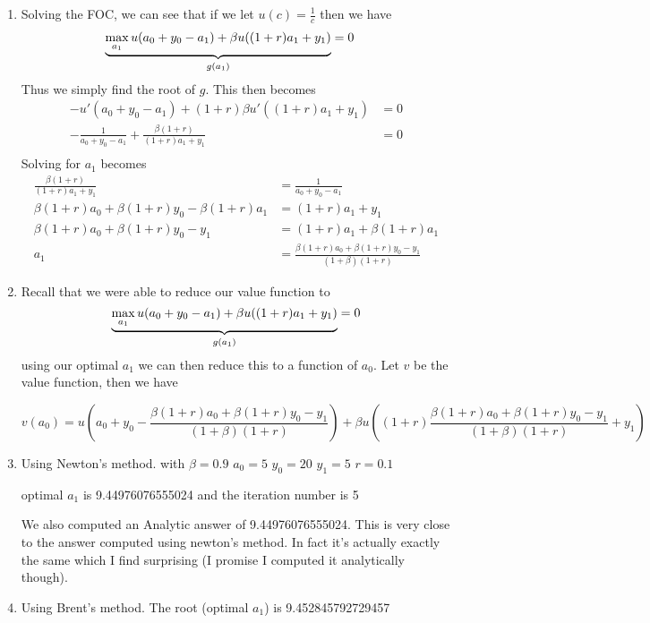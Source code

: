 \documentclass[12pt]{article}
\begin{document}
\begin{enumerate}
	\item  Solving the FOC, we can see that if we let $u(c) = \frac{1}{c}$ then we have
		 \begin{align*}
			 \underbrace{\max_{a_1} u(a_0 + y_0 - a_1) + \beta u((1+r)a_1 + y_1)}_\text{$ g(a_1) $} &= 0
		\end{align*}
		Thus we simply find the root of $g$. This then becomes
		\begin{align*}
			-u'(a_0 + y_0 - a_1) + (1+r)\beta u'((1+r)a_1 + y_1) &= 0 \\ 
			- \frac{1}{a_0 + y_0 - a_1} + \frac{\beta(1+r)}{(1+r)a_1 + y_1} &= 0 \\
		\end{align*}
		Solving for $a_1$ becomes
		\begin{align*}
			\frac{\beta(1+r)}{(1+r)a_1 + y_1} &= \frac{1}{a_0 + y_0 - a_1} \\
			\beta(1+r)a_0 + \beta(1+r)y_0 - \beta(1+r)a_1  &= (1+r)a_1 + y_1  \\
			\beta(1+r)a_0 + \beta(1+r)y_0 - y_1 &= (1+r)a_1 +\beta(1+r)a_1 \\
			a_1 &= \frac{\beta(1+r)a_0 + \beta(1+r)y_0 - y_1}{(1+ \beta)(1+r)}
		\end{align*}

	\item Recall that we were able to reduce our value function to
		$$ \underbrace{\max_{a_1} u(a_0 + y_0 - a_1) + \beta u((1+r)a_1 + y_1)}_\text{$ g(a_1) $} = 0$$ 
		using our optimal $a_1$ we can then reduce this to a function of $a_0$. Let $v$ be the value function, then we have

		$$v(a_0) = u(a_0 + y_0 -  \frac{\beta(1+r)a_0 + \beta(1+r)y_0 - y_1}{(1+ \beta)(1+r)}) + \beta u((1+r)\frac{\beta(1+r)a_0 + \beta(1+r)y_0 - y_1}{(1+ \beta)(1+r)}  +y_1)$$

	\item Using Newton's method.
with
$\beta =0.9$
$a_0=5$
$y_0 =20$
$y_1 =5$
$r=0.1$

optimal $a_1$ is 9.44976076555024 and the iteration number is 5

We also computed an Analytic answer of 9.44976076555024. This is very close to the answer computed using newton's method. In fact it's actually exactly the same which I find surprising (I promise I computed it analytically though).


\item Using Brent's method. The root (optimal $a_1$) is 9.452845792729457

	
\end{enumerate}
\end{document}
